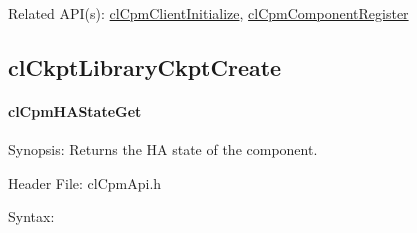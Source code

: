 {\begin{Desc}
\item[Related API(s):]\hyperlink{group__group14}{cl\-Cpm\-Client\-Initialize}, \hyperlink{group__group14}{cl\-Cpm\-Component\-Register} \end{Desc}
\newpage



\subsection{clCkptLibraryCkptCreate}
\hypertarget{pagecpm116}{}\paragraph{cl\-Cpm\-HAState\-Get}\label{pagecpm116}
\begin{Desc}
\item[Synopsis:]Returns the HA state of the component.\end{Desc}
\begin{Desc}
\item[Header File:]clCpmApi.h\end{Desc}
\begin{Desc}
\item[Syntax:]


\end{Desc}}
